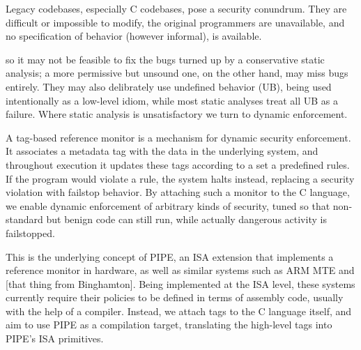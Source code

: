 \documentclass[acmsmall,review,anonymous]{acmart}\settopmatter{printfolios=true,printccs=false,printacmref=false}
\begin{document}
Legacy codebases, especially C codebases, pose a security conundrum. 
They are difficult or impossible to
modify, the original programmers are unavailable, and no specification of behavior (however informal), is available.


so it may not be feasible to fix the bugs
turned up by a conservative static analysis; a more permissive but unsound one, on the other hand,
may miss bugs entirely. They may also delibrately use undefined behavior (UB), being used intentionally
as a low-level idiom, while most static analyses treat all UB as a failure. Where static analysis
is unsatisfactory we turn to dynamic enforcement.

A tag-based reference monitor is a mechanism for dynamic security enforcement. It associates
a metadata tag with the data in the underlying system, and throughout execution it updates these
tags according to a set a predefined rules. If the program would violate a rule, the system halts
instead, replacing a security violation with failstop behavior. By attaching such a monitor to
the C language, we enable dynamic enforcement of arbitrary kinds of security, tuned so that
non-standard but benign code can still run, while actually dangerous activity is failstopped.

This is the underlying concept of PIPE, an ISA extension that implements a reference monitor in
hardware, as well as similar systems such as ARM MTE and [that thing from Binghamton]. Being
implemented at the ISA level, these systems currently require their policies to be defined in terms of
assembly code, usually with the help of a compiler. Instead, we attach tags to the C language
itself, and aim to use PIPE as a compilation target, translating the high-level tags into
PIPE's ISA primitives.
\end{document}

